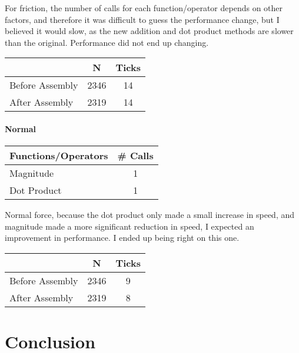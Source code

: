 \documentclass{article}
\begin{document}
For friction, the number of calls for each function/operator depends on other factors, and therefore it was difficult to guess the performance change, but I believed it would slow, as the new addition and dot product methods are slower than the original. Performance did not end up changing.

\begin{table}[ht!]
\centering
\begin{tabular}{l|c|c}
                &   N   &  Ticks \\
\hline
Before Assembly &  2346 &  14  \\
After Assembly  &  2319 &  14  \\
\end{tabular}
\end{table}

\vspace{5mm}

\subsection{Normal}

\begin{table}[ht!]
\centering
\begin{tabular}{l|c}
Functions/Operators  &  \# Calls \\
\hline
Magnitude            &  1  \\
Dot Product          &  1  \\
\end{tabular}
\end{table}

Normal force, because the dot product only made a small increase in speed, and magnitude made a more significant reduction in speed, I expected an improvement in performance. I ended up being right on this one.

\begin{table}[ht!]
\centering
\begin{tabular}{l|c|c}
                &   N   &  Ticks \\
\hline
Before Assembly &  2346 &  9  \\
After Assembly  &  2319 &  8  \\
\end{tabular}
\end{table}

\pagebreak[0]

\part{Conclusion}
\end{document}
